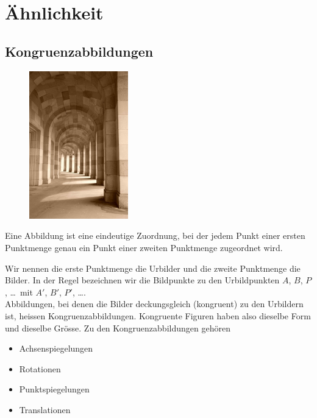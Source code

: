 \documentclass[%
11pt,%
twoside,%
titlepage,%
swissgerman,%
headsepline%
]{scrartcl}
\newcommand{\definition}[1]{\colorbox{emerald}{#1}}
\theoremstyle{definition}
\theoremstyle{plain}
\begin{document}
\section{Ähnlichkeit}

\subsection{Kongruenzabbildungen}
\begin{figure}
  \begin{center}
    \includegraphics[width=0.382\textwidth]{pictures/torbogen}
  \end{center}
\end{figure}
Eine \definition{Abbildung} ist eine eindeutige Zuordnung, bei der jedem Punkt einer ersten Punktmenge genau ein Punkt einer zweiten Punktmenge zugeordnet wird.

Wir nennen die erste Punktmenge die \definition{Urbilder} und die zweite Punktmenge die \definition{Bilder}. In der Regel bezeichnen wir die Bildpunkte zu den Urbildpunkten $A$, $B$, $P$, \dots\ mit $A'$, $B'$, $P'$, \dots.\\

Abbildungen, bei denen die Bilder deckungsgleich (kongruent) zu den Urbildern ist, heissen Kongruenzabbildungen. Kongruente Figuren haben also dieselbe Form und dieselbe Gr\"osse. Zu den Kongruenzabbildungen geh\"oren
\begin{itemize}
\item Achsenspiegelungen
\item Rotationen
\item Punktspiegelungen
\item Translationen
\end{itemize}
\end{document}
